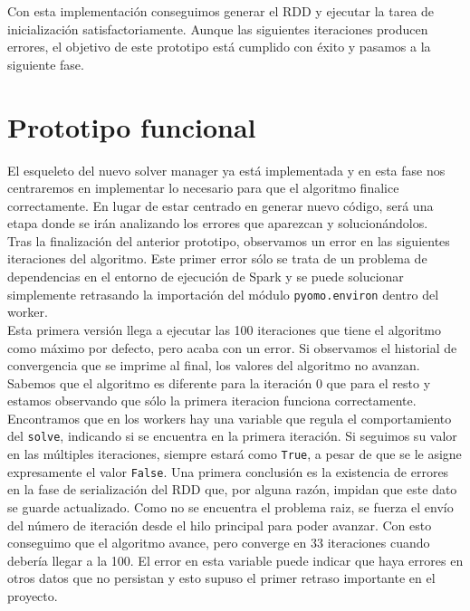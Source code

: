 Con esta implementación conseguimos generar el RDD y ejecutar la tarea de inicialización satisfactoriamente. Aunque las siguientes iteraciones producen errores, el objetivo de este prototipo está cumplido con éxito y pasamos a la siguiente fase.

\section{Prototipo funcional}


El esqueleto del nuevo solver manager ya está implementada y en esta fase nos centraremos en implementar lo necesario para que el algoritmo finalice correctamente. En lugar de estar centrado en generar nuevo código, será una etapa donde se irán analizando los errores que aparezcan y solucionándolos. \\

Tras la finalización del anterior prototipo, observamos un error en las siguientes iteraciones del algoritmo. Este primer error sólo se trata de un problema de dependencias en el entorno de ejecución de Spark y se puede solucionar simplemente retrasando la importación del módulo \texttt{pyomo.environ} dentro del worker.\\

Esta primera versión llega a ejecutar las 100 iteraciones que tiene el algoritmo como máximo por defecto, pero acaba con un error. Si observamos el historial de convergencia que se imprime al final, los valores del algoritmo no avanzan. Sabemos que el algoritmo es diferente para la iteración 0 que para el resto y estamos observando que sólo la primera iteracion funciona correctamente. Encontramos que en los workers hay una variable que regula el comportamiento del \texttt{solve}, indicando si se encuentra en la primera iteración. Si seguimos su valor en las múltiples iteraciones, siempre estará como \texttt{True}, a pesar de que se le asigne expresamente el valor \texttt{False}. 
Una primera conclusión es la existencia de errores en la fase de serialización del RDD que, por alguna razón, impidan que este dato se guarde actualizado. Como no se encuentra el problema raiz, se fuerza el envío del número de iteración desde el hilo principal para poder avanzar. Con esto conseguimo que el algoritmo avance, pero converge en 33 iteraciones cuando debería llegar a la 100. El error en esta variable puede indicar que haya errores en otros datos que no persistan y esto supuso el primer retraso importante en el proyecto.\\

